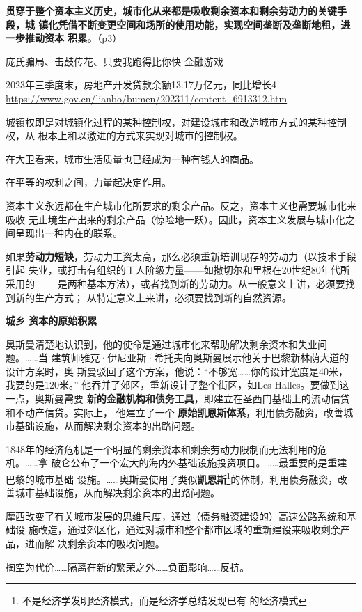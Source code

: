 \textbf{贯穿于整个资本主义历史，城市化从来都是吸收剩余资本和剩余劳动力的关键手段，城
镇化凭借不断变更空间和场所的使用功能，实现空间垄断及垄断地租，进一步推动资本
积累。}（p3）

庞氏骗局、击鼓传花、只要我跑得比你快  金融游戏

2023年三季度末，房地产开发贷款余额13.17万亿元，同比增长4%
\url{https://www.gov.cn/lianbo/bumen/202311/content_6913312.htm}

城镇权即是对城镇化过程的某种控制权，对建设城市和改造城市方式的某种控制权，从
根本上和以激进的方式来实现对城市的控制权。

在大卫看来，城市生活质量也已经成为一种有钱人的商品。

在平等的权利之间，力量起决定作用。

资本主义永远都在生产城市化所要求的剩余产品。反之，资本主义也需要城市化来吸收
无止境生产出来的剩余产品（惊险地一跃）。因此，资本主义发展与城市化之间呈现出一种内在的联系。

如果\textbf{劳动力短缺}，劳动力工资太高，那么必须重新培训现存的劳动力（以技术手段引起
失业，或打击有组织的工人阶级力量——如撒切尔和里根在20世纪80年代所采用的——
是两种基本方法），或者找到新的劳动力。从一般意义上讲，必须要找到新的生产方式；
从特定意义上来讲，必须要找到新的自然资源。

\textbf{城乡 资本的原始积累}

奥斯曼清楚地认识到，他的使命是通过城市化来帮助解决剩余资本和失业问题。……当
建筑师雅克·伊尼亚斯·希托夫向奥斯曼展示他关于巴黎新林荫大道的设计方案时，奥
斯曼驳回了这个方案，他说：“不够宽……你的设计宽度是40米，我要的是120米。”
他吞并了郊区，重新设计了整个街区，如Les Halles。要做到这一点，奥斯曼需要\textbf{
新的金融机构和债务工具}，即建立在圣西门基础上的流动信贷和不动产信贷。实际上，
他建立了一个 \textbf{原始凯恩斯体系}，利用债务融资，改善城市基础设施，从而解决剩余资本的出路问题。

1848年的经济危机是一个明显的剩余资本和剩余劳动力限制而无法利用的危机。……拿
破仑公布了一个宏大的海内外基础设施投资项目。……最重要的是重建巴黎的城市基础
设施。……奥斯曼使用了类似\textbf{凯恩斯}\footnote{不是经济学发明经济模式，而是经济学总结发现已有
  的经济模式}的体制，利用债务融资，改善城市基础设施，从而解决剩余资本的出路问题。

摩西改变了有关城市发展的思维尺度，通过（债务融资建设的）高速公路系统和基础设
施改造，通过郊区化，通过对城市和整个都市区域的重新建设来吸收剩余产品，进而解
决剩余资本的吸收问题。

掏空为代价……隔离在新的繁荣之外……负面影响……反抗。

